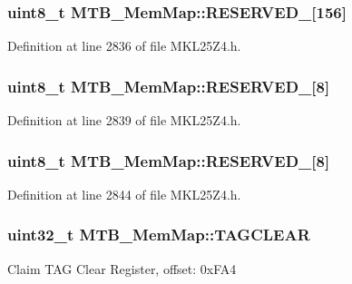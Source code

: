 \subsubsection[{\texorpdfstring{R\+E\+S\+E\+R\+V\+E\+D\+\_\+1}{RESERVED_1}}]{\setlength{\rightskip}{0pt plus 5cm}uint8\+\_\+t M\+T\+B\+\_\+\+Mem\+Map\+::\+R\+E\+S\+E\+R\+V\+E\+D\+\_\mbox{[}156\mbox{]}}\hypertarget{struct_m_t_b___mem_map_a404eebe408f9386a32efe60d533a89ea}{}\label{struct_m_t_b___mem_map_a404eebe408f9386a32efe60d533a89ea}


Definition at line 2836 of file M\+K\+L25\+Z4.\+h.

\subsubsection[{\texorpdfstring{R\+E\+S\+E\+R\+V\+E\+D\+\_\+2}{RESERVED_2}}]{\setlength{\rightskip}{0pt plus 5cm}uint8\+\_\+t M\+T\+B\+\_\+\+Mem\+Map\+::\+R\+E\+S\+E\+R\+V\+E\+D\+\_\mbox{[}8\mbox{]}}\hypertarget{struct_m_t_b___mem_map_a6a9efecd836ca4d1dd3d7058600f042e}{}\label{struct_m_t_b___mem_map_a6a9efecd836ca4d1dd3d7058600f042e}


Definition at line 2839 of file M\+K\+L25\+Z4.\+h.

\subsubsection[{\texorpdfstring{R\+E\+S\+E\+R\+V\+E\+D\+\_\+3}{RESERVED_3}}]{\setlength{\rightskip}{0pt plus 5cm}uint8\+\_\+t M\+T\+B\+\_\+\+Mem\+Map\+::\+R\+E\+S\+E\+R\+V\+E\+D\+\_\mbox{[}8\mbox{]}}\hypertarget{struct_m_t_b___mem_map_adaf45585328ad77c4b9c56ded53c3acc}{}\label{struct_m_t_b___mem_map_adaf45585328ad77c4b9c56ded53c3acc}


Definition at line 2844 of file M\+K\+L25\+Z4.\+h.

\subsubsection[{\texorpdfstring{T\+A\+G\+C\+L\+E\+AR}{TAGCLEAR}}]{\setlength{\rightskip}{0pt plus 5cm}uint32\+\_\+t M\+T\+B\+\_\+\+Mem\+Map\+::\+T\+A\+G\+C\+L\+E\+AR}\hypertarget{struct_m_t_b___mem_map_a341492ac466b6c26b188093417006f72}{}\label{struct_m_t_b___mem_map_a341492ac466b6c26b188093417006f72}
Claim T\+AG Clear Register, offset\+: 0x\+F\+A4 

